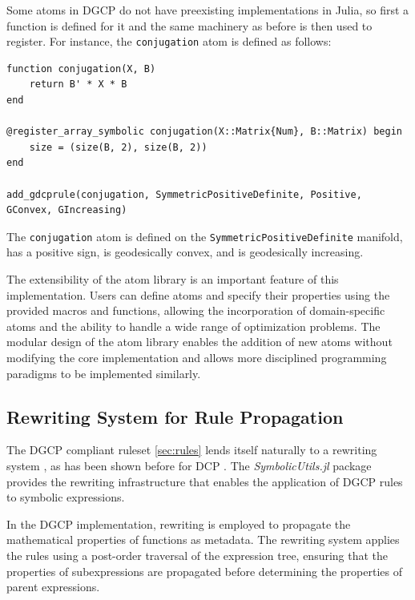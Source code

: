 \documentclass[twoside,11pt]{article}
\begin{document}
Some atoms in DGCP do not have preexisting implementations in Julia, so first a function is defined for it and the same machinery as before is then used to register. For instance, the \texttt{conjugation} atom is defined as follows:

\begin{listing}[h!]
\label{conjugation}
\begin{verbatim}
function conjugation(X, B)
    return B' * X * B
end

@register_array_symbolic conjugation(X::Matrix{Num}, B::Matrix) begin
    size = (size(B, 2), size(B, 2))
end

add_gdcprule(conjugation, SymmetricPositiveDefinite, Positive, GConvex, GIncreasing)
\end{verbatim}
\caption{The \texttt{conjugation} atom is defined on the \texttt{SymmetricPositiveDefinite} manifold, has a positive sign, is geodesically convex, and is geodesically increasing.}
\end{listing}

The extensibility of the atom library is an important feature of this implementation. Users can define atoms and specify their properties using the provided macros and functions, allowing the incorporation of domain-specific atoms and the ability to handle a wide range of optimization problems. The modular design of the atom library enables the addition of new atoms without modifying the core implementation and allows more disciplined programming paradigms to be implemented similarly.

\subsection{Rewriting System for Rule Propagation}

The DGCP compliant ruleset \ref{sec:rules} lends itself naturally to a rewriting system \citep{dershowitz1990rewrite}, as has been shown before for DCP \citep{agrawal2018rewriting}. The \textsl{SymbolicUtils.jl} package provides the rewriting infrastructure that enables the application of DGCP rules to symbolic expressions.

In the DGCP implementation, rewriting is employed to propagate the mathematical properties of functions as metadata. The rewriting system applies the rules using a post-order traversal of the expression tree, ensuring that the properties of subexpressions are propagated before determining the properties of parent expressions.
\end{document}
